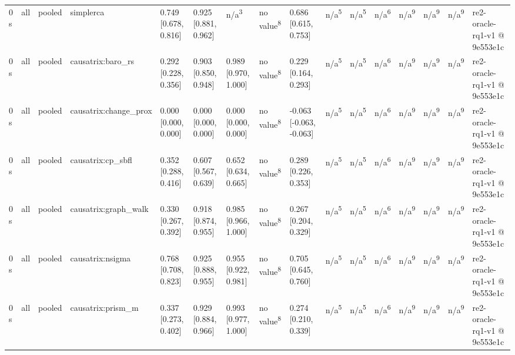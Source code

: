 \begin{table}[t]
\begin{tabular}{llllllllllllllll}
0 s & all & pooled & simplerca & 0.749 [0.678, 0.816] & 0.925 [0.881, 0.962] & n/a\textsuperscript{3} & no value\textsuperscript{8} & 0.686 [0.615, 0.753] & n/a\textsuperscript{5} & n/a\textsuperscript{5} & n/a\textsuperscript{6} & n/a\textsuperscript{9} & n/a\textsuperscript{9} & n/a\textsuperscript{9} & re2-oracle-rq1-v1 @ 9e553e1c \\
0 s & all & pooled & causatrix:baro\_rs & 0.292 [0.228, 0.356] & 0.903 [0.850, 0.948] & 0.989 [0.970, 1.000] & no value\textsuperscript{8} & 0.229 [0.164, 0.293] & n/a\textsuperscript{5} & n/a\textsuperscript{5} & n/a\textsuperscript{6} & n/a\textsuperscript{9} & n/a\textsuperscript{9} & n/a\textsuperscript{9} & re2-oracle-rq1-v1 @ 9e553e1c \\
0 s & all & pooled & causatrix:change\_prox & 0.000 [0.000, 0.000] & 0.000 [0.000, 0.000] & 0.000 [0.000, 0.000] & no value\textsuperscript{8} & -0.063 [-0.063, -0.063] & n/a\textsuperscript{5} & n/a\textsuperscript{5} & n/a\textsuperscript{6} & n/a\textsuperscript{9} & n/a\textsuperscript{9} & n/a\textsuperscript{9} & re2-oracle-rq1-v1 @ 9e553e1c \\
0 s & all & pooled & causatrix:cp\_sbfl & 0.352 [0.288, 0.416] & 0.607 [0.567, 0.639] & 0.652 [0.634, 0.665] & no value\textsuperscript{8} & 0.289 [0.226, 0.353] & n/a\textsuperscript{5} & n/a\textsuperscript{5} & n/a\textsuperscript{6} & n/a\textsuperscript{9} & n/a\textsuperscript{9} & n/a\textsuperscript{9} & re2-oracle-rq1-v1 @ 9e553e1c \\
0 s & all & pooled & causatrix:graph\_walk & 0.330 [0.267, 0.392] & 0.918 [0.874, 0.955] & 0.985 [0.966, 1.000] & no value\textsuperscript{8} & 0.267 [0.204, 0.329] & n/a\textsuperscript{5} & n/a\textsuperscript{5} & n/a\textsuperscript{6} & n/a\textsuperscript{9} & n/a\textsuperscript{9} & n/a\textsuperscript{9} & re2-oracle-rq1-v1 @ 9e553e1c \\
0 s & all & pooled & causatrix:nsigma & 0.768 [0.708, 0.823] & 0.925 [0.888, 0.955] & 0.955 [0.922, 0.981] & no value\textsuperscript{8} & 0.705 [0.645, 0.760] & n/a\textsuperscript{5} & n/a\textsuperscript{5} & n/a\textsuperscript{6} & n/a\textsuperscript{9} & n/a\textsuperscript{9} & n/a\textsuperscript{9} & re2-oracle-rq1-v1 @ 9e553e1c \\
0 s & all & pooled & causatrix:prism\_m & 0.337 [0.273, 0.402] & 0.929 [0.884, 0.966] & 0.993 [0.977, 1.000] & no value\textsuperscript{8} & 0.274 [0.210, 0.339] & n/a\textsuperscript{5} & n/a\textsuperscript{5} & n/a\textsuperscript{6} & n/a\textsuperscript{9} & n/a\textsuperscript{9} & n/a\textsuperscript{9} & re2-oracle-rq1-v1 @ 9e553e1c \\

\end{tabular}
\end{table}
